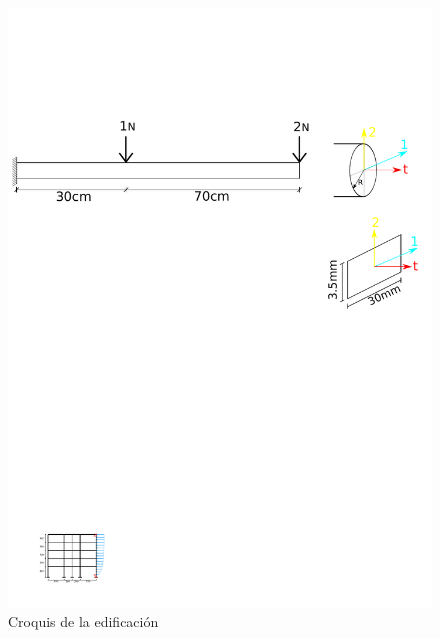 \documentclass[a4paper,12pt]{article}
\begin{document}
\begin{figure}[hb]
\begin{minipage}[b]{0.65\linewidth}
    \centering
\includegraphics[width=\textwidth]{recorte}
\caption{Croquis de la edificación}
\label{fig:croquis}
\end{minipage}
\hspace{0.9cm}
\begin{minipage}[b]{0.25\linewidth}
    \centering

\end{minipage}
\end{figure}
\end{document}
